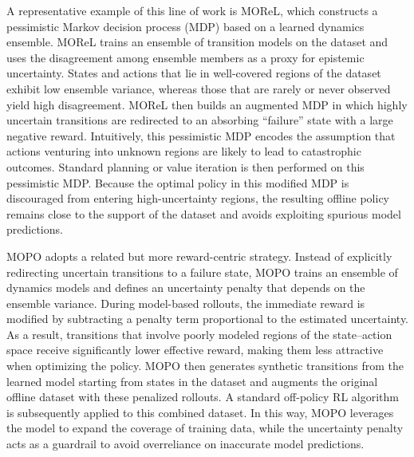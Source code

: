 \documentclass[master,english,final]{kaist-ucs}
\begin{document}
A representative example of this line of work is MOReL\cite{kidambi2020morel}, which constructs a pessimistic Markov decision process (MDP) based on a learned dynamics ensemble. MOReL\cite{kidambi2020morel} trains an ensemble of transition models on the dataset and uses the disagreement among ensemble members as a proxy for epistemic uncertainty. States and actions that lie in well-covered regions of the dataset exhibit low ensemble variance, whereas those that are rarely or never observed yield high disagreement. MOReL\cite{kidambi2020morel} then builds an augmented MDP in which highly uncertain transitions are redirected to an absorbing “failure” state with a large negative reward. Intuitively, this pessimistic MDP encodes the assumption that actions venturing into unknown regions are likely to lead to catastrophic outcomes. Standard planning or value iteration is then performed on this pessimistic MDP. Because the optimal policy in this modified MDP is discouraged from entering high-uncertainty regions, the resulting offline policy remains close to the support of the dataset and avoids exploiting spurious model predictions.

MOPO\cite{yu2020mopo} adopts a related but more reward-centric strategy. Instead of explicitly redirecting uncertain transitions to a failure state, MOPO trains an ensemble of dynamics models and defines an uncertainty penalty that depends on the ensemble variance. During model-based rollouts, the immediate reward is modified by subtracting a penalty term proportional to the estimated uncertainty. As a result, transitions that involve poorly modeled regions of the state–action space receive significantly lower effective reward, making them less attractive when optimizing the policy. MOPO then generates synthetic transitions from the learned model starting from states in the dataset and augments the original offline dataset with these penalized rollouts. A standard off-policy RL algorithm is subsequently applied to this combined dataset. In this way, MOPO\cite{yu2020mopo} leverages the model to expand the coverage of training data, while the uncertainty penalty acts as a guardrail to avoid overreliance on inaccurate model predictions.
\end{document}
